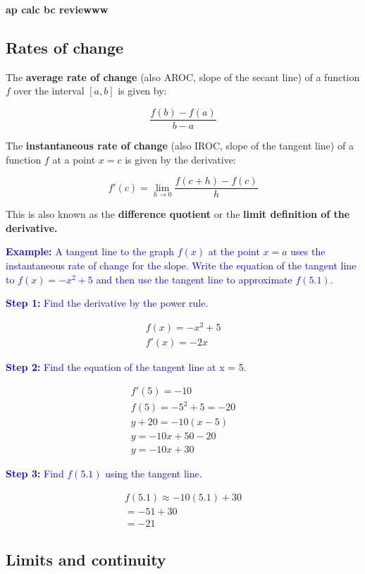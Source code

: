 \documentclass[letterpaper, 12pt]{article}
\newcommand{\example}[1]{\textcolor{blue}{\textbf{Example:} #1}}
\newcommand{\step}[2]{\textcolor{blue}{\textbf{Step #1:} #2}}
\begin{document}
    
    \begin{center}
    \textbf{{\Large ap calc bc reviewww}}
    \end{center}
    
\subsection*{Rates of change}

The \textbf{average rate of change} (also AROC, slope of the secant line) of a function $f$ over the interval $[a, b]$ is given by:

\[\frac{f(b) - f(a)}{b - a}\]

The \textbf{instantaneous rate of change} (also IROC, slope of the tangent line) of a function $f$ at a point $x = c$ is given by the derivative:

\[f'(c) = \lim_{h \to 0} \frac{f(c + h) - f(c)}{h}\]

This is also known as the \textbf{difference quotient} or the \textbf{limit definition of the derivative.}

\example{A tangent line to the graph $f(x)$ at the point $x = a$ uses the instantaneous rate of change for the slope. Write the equation of the tangent line to $f(x) = -x^2+5$ and then use the tangent line to approximate $f(5.1)$.}

\step{1}{Find the derivative by the power rule.}

\begin{gather*}
f(x) = -x^2+5 \\
f'(x) = -2x
\end{gather*}

\step{2}{Find the equation of the tangent line at x = 5.}

\begin{gather*}
f'(5) = -10 \\
f(5) = -5^2 + 5 = -20 \\
y+20 = -10(x-5) \\
y = -10x + 50 - 20 \\
y = -10x + 30
\end{gather*}

\step{3}{Find $f(5.1)$ using the tangent line.}

\begin{gather*}
f(5.1) \approx -10(5.1) + 30 \\ 
= -51 + 30 \\
= \boxed{-21}
\end{gather*}

\subsection*{Limits and continuity}
\end{document}
